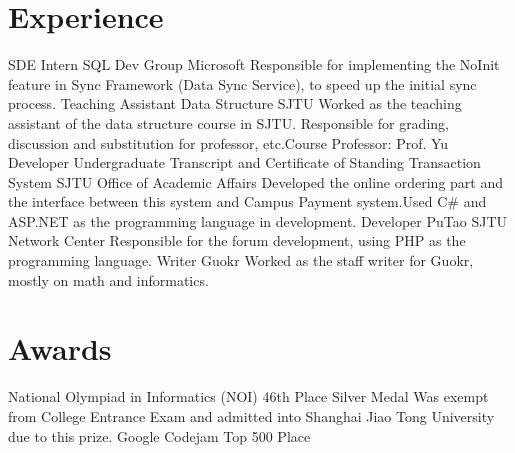 \documentclass[10pt]{moderncv}   %
\begin{document}
\section{Experience}
        {SDE Intern}
        {SQL Dev Group}
        {Microsoft}
        {}
        {Responsible for implementing the NoInit feature in Sync Framework (Data Sync Service), to speed up the initial sync process.}
        {Teaching Assistant}
        {Data Structure}
        {SJTU}
        {}
        {Worked as the teaching assistant of the data structure course in SJTU. Responsible for grading, discussion and substitution for professor, etc.\newline{}Course Professor: Prof. Yu\footnotemark{}}
        {Developer}
        {Undergraduate Transcript and Certificate of Standing Transaction System}
        {SJTU Office of Academic Affairs}
        {}
        {Developed the online ordering part and the interface between this system and Campus Payment system.\newline{}Used C\# and ASP.NET as the programming language in development.}
        {Developer}
        {PuTao\footnotemark{}}
        {SJTU Network Center}
        {}
        {Responsible for the forum development, using PHP as the programming language. }
        {Writer}
        {Guokr\footnotemark{}}
        {}
        {}
        {Worked as the staff writer for Guokr, mostly on math and informatics.}

\section{Awards}
        {National Olympiad in Informatics (NOI)}
        {46th Place}
        {Silver Medal}
        {}
        {Was exempt from College Entrance Exam and admitted into Shanghai Jiao Tong University due to this prize.}
        {Google Codejam}
        {Top 500 Place}
        {}{}{}
\end{document}
